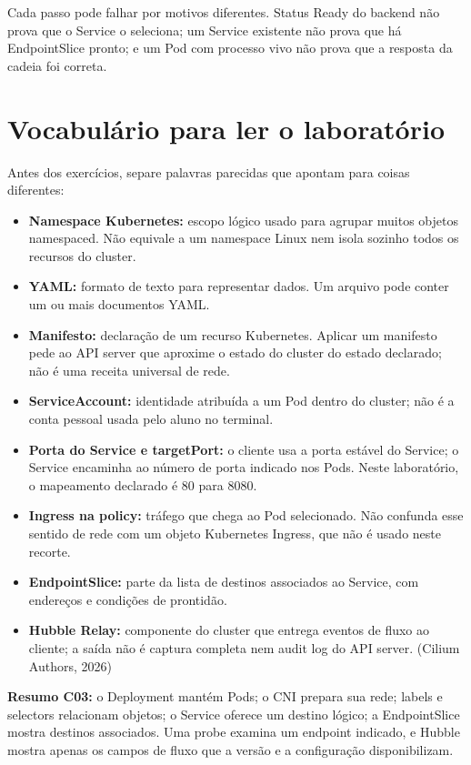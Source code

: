 \documentclass[12pt,openany,oneside,a4paper,chapter=TITLE,english,brazil]{abntex2}
\providecommand{\tightlist}{\setlength{\itemsep}{0pt}\setlength{\parskip}{0pt}}
\begin{document}
Cada passo pode falhar por motivos diferentes. Status Ready do backend não prova que o Service o seleciona; um Service existente não prova que há EndpointSlice pronto; e um Pod com processo vivo não prova que a resposta da cadeia foi correta.

\section{Vocabulário para ler o laboratório}\label{vocabuluxe1rio-para-ler-o-laboratuxf3rio}

Antes dos exercícios, separe palavras parecidas que apontam para coisas diferentes:

\begin{itemize}
\tightlist
\item
  \textbf{Namespace Kubernetes:} escopo lógico usado para agrupar muitos objetos namespaced. Não equivale a um namespace Linux nem isola sozinho todos os recursos do cluster.
\item
  \textbf{YAML:} formato de texto para representar dados. Um arquivo pode conter um ou mais documentos YAML.
\item
  \textbf{Manifesto:} declaração de um recurso Kubernetes. Aplicar um manifesto pede ao API server que aproxime o estado do cluster do estado declarado; não é uma receita universal de rede.
\item
  \textbf{ServiceAccount:} identidade atribuída a um Pod dentro do cluster; não é a conta pessoal usada pelo aluno no terminal.
\item
  \textbf{Porta do Service e targetPort:} o cliente usa a porta estável do Service; o Service encaminha ao número de porta indicado nos Pods. Neste laboratório, o mapeamento declarado é 80 para 8080.
\item
  \textbf{Ingress na policy:} tráfego que chega ao Pod selecionado. Não confunda esse sentido de rede com um objeto Kubernetes Ingress, que não é usado neste recorte.
\item
  \textbf{EndpointSlice:} parte da lista de destinos associados ao Service, com endereços e condições de prontidão.
\item
  \textbf{Hubble Relay:} componente do cluster que entrega eventos de fluxo ao cliente; a saída não é captura completa nem audit log do API server. (Cilium Authors, 2026)
\end{itemize}

\textbf{Resumo C03:} o Deployment mantém Pods; o CNI prepara sua rede; labels e selectors relacionam objetos; o Service oferece um destino lógico; a EndpointSlice mostra destinos associados. Uma probe examina um endpoint indicado, e Hubble mostra apenas os campos de fluxo que a versão e a configuração disponibilizam.
\end{document}
